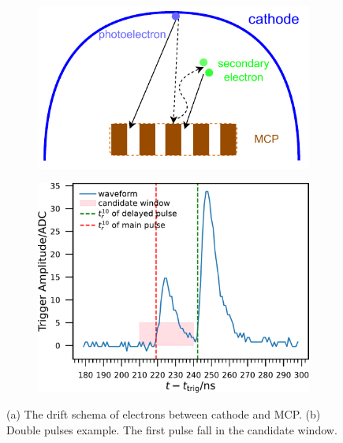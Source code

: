 \begin{figure}[!htbp]
    \centering
    \begin{subfigure}[t]{\SF\textwidth}
        \includegraphics[width=\textwidth]{figures/method/MCPelectron.pdf}
        \caption{}%
        \label{fig:mcpelectron}
    \end{subfigure}
    \begin{subfigure}[t]{\SF\textwidth}
        \includegraphics[width=\textwidth]{figures/method/triggerDoublePulse.pdf}
        \caption{}%
        \label{fig:triggerTT2pulse}
    \end{subfigure}
    \caption{(a) The drift schema of electrons between cathode and MCP. (b) Double pulses example. The first pulse fall in the candidate window.}
\end{figure}

